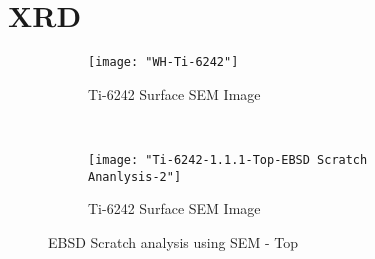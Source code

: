 \section{XRD}
\begin{figure}[H]
    \centering
    \begin{subfigure}{0.49\textwidth}
        \texttt{[image: "WH-Ti-6242"]}
        \caption{Ti-6242 Surface SEM Image}
        \label{fig:Ti-6242 Williamson-Hall Plot}
    \end{subfigure}
    ~
    \begin{subfigure}{0.49\textwidth}
        \texttt{[image: "Ti-6242-1.1.1-Top-EBSD Scratch Ananlysis-2"]}
        \caption{Ti-6242 Surface SEM Image}
        \label{fig:Ti-6242 Williamson-Hall Plot}
    \end{subfigure}
  
    \caption{EBSD Scratch analysis using SEM - Top}
    \label{fig:EBSD Scratch analysis using SEM - Top}
\end{figure}